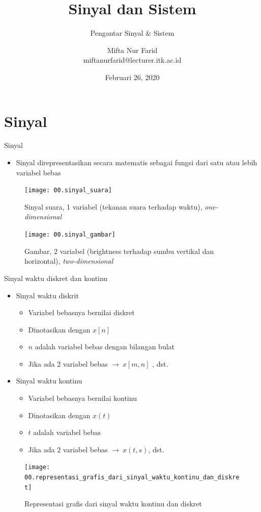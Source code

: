 \documentclass[aspectratio=169]{beamer}
\author{Mifta Nur Farid \\
	miftanurfarid@lecturer.itk.ac.id}
\title{Sinyal dan Sistem}
\subtitle{Pengantar Sinyal \& Sistem}
\institute{Teknik Elektro \\ Institut Teknologi Kalimantan \\ Balikpapan, Indonesia}
\date{\tiny Februari 26, 2020}
\begin{document}
\begin{frame}[t,plain]
\titlepage
\end{frame}

\section{Sinyal}

\begin{frame}{Sinyal}
	\begin{itemize}
		\item Sinyal direpresentasikan secara matematis sebagai fungsi dari satu atau lebih variabel bebas
	\end{itemize}
	\begin{multicols}{2}
		\begin{figure}
			\texttt{[image: 00.sinyal\_suara]}
			\caption{Sinyal suara, 1 variabel (tekanan suara terhadap waktu), \textit{one-dimensional}}
		\end{figure}
		\begin{figure}
			\texttt{[image: 00.sinyal\_gambar]}
			\caption{Gambar, 2 variabel (brightness terhadap sumbu vertikal dan horizontal), \textit{two-dimensional}}
		\end{figure}
	\end{multicols}
\end{frame}

\begin{frame}{Sinyal waktu diskret dan kontinu}
	\begin{multicols}{2}
		\begin{itemize}
			\item Sinyal waktu diskrit
			\begin{itemize}
				\item Variabel bebasnya bernilai diskret
				\item Dinotasikan dengan $ x[n] $
				\item $ n $ adalah variabel bebas dengan bilangan bulat
				\item Jika ada 2 variabel bebas $ \rightarrow ~ x[m,n] $ , dst.
			\end{itemize}
			\item Sinyal waktu kontinu
			\begin{itemize}
				\item Variabel bebasnya bernilai kontinu
				\item Dinotasikan dengan $ x(t) $
				\item $ t $ adalah variabel bebas
				\item Jika ada 2 variabel bebas $ \rightarrow ~ x(t,s) $, dst.
			\end{itemize}
		\end{itemize}
		\vfill\null
		\columnbreak
		\begin{figure}
			\centering
			\texttt{[image: 00.representasi\_grafis\_dari\_sinyal\_waktu\_kontinu\_dan\_diskret]}
			\caption{Representasi grafis dari sinyal waktu kontinu dan diskret}
		\end{figure}
	\end{multicols}
\end{frame}
\end{document}
